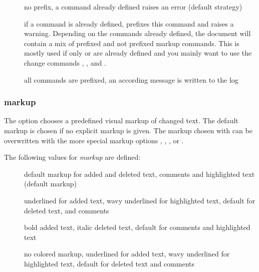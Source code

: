 \begin{description}
	\item [] no prefix, a command already defined raises an error (default strategy)
	\item [] if a command is already defined,  prefixes this command and raises a warning.
		Depending on the commands already defined, the document will contain a mix of prefixed and not prefixed markup commands.
		This is mostly used if only  or  are already defined and you mainly want to use the change commands , , and .
	\item [] all commands are prefixed, an according message is written to the log
\end{description}



\subsubsection{markup}


The  option chooses a predefined visual markup of changed text.
The default markup is chosen if no explicit markup is given.
The markup chosen with  can be overwritten with the more special markup options , , , or .

The following values for \emph{markup} are defined:

\begin{description}
	\item [] default markup for added and deleted text, comments and highlighted text (default markup)
	\item [] underlined for added text, wavy underlined for highlighted text, default for deleted text, and comments
	\item [] bold added text, italic deleted text, default for comments and highlighted text
	\item [] no colored markup, underlined for added text, wavy underlined for highlighted text, default for deleted text and comments
\end{description}

